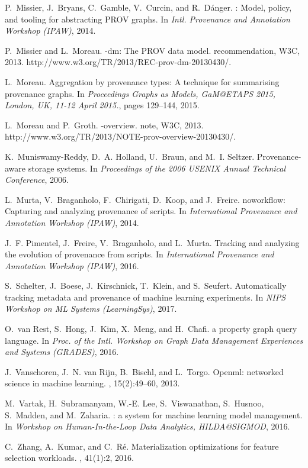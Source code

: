 \documentclass[11pt]{article}
\begin{document}
\begin{thebibliography}{10}
P.~Missier, J.~Bryans, C.~Gamble, V.~Curcin, and R.~D{\'{a}}nger.
: Model, policy, and tooling for abstracting {PROV} graphs.
\newblock In {\em Intl. Provenance and Annotation Workshop (IPAW)}, 2014.

P.~Missier and L.~Moreau.
-dm: The {PROV} data model.
 recommendation, W3C, 2013.
\newblock http://www.w3.org/TR/2013/REC-prov-dm-20130430/.

L.~Moreau.
\newblock Aggregation by provenance types: {A} technique for summarising
  provenance graphs.
\newblock In {\em Proceedings Graphs as Models, GaM@ETAPS 2015, London, UK,
  11-12 April 2015.}, pages 129--144, 2015.

L.~Moreau and P.~Groth.
-overview.
 note, W3C, 2013.
\newblock http://www.w3.org/TR/2013/NOTE-prov-overview-20130430/.

K.~Muniswamy{-}Reddy, D.~A. Holland, U.~Braun, and M.~I. Seltzer.
\newblock Provenance-aware storage systems.
\newblock In {\em Proceedings of the 2006 {USENIX} Annual Technical Conference}, 2006.

L.~Murta, V.~Braganholo, F.~Chirigati, D.~Koop, and J.~Freire.
\newblock noworkflow: Capturing and analyzing provenance of scripts.
\newblock In {\em  International Provenance and Annotation Workshop (IPAW)}, 2014.

J.~F. Pimentel, J.~Freire, V.~Braganholo, and L.~Murta.
\newblock Tracking and analyzing the evolution of provenance from scripts.
\newblock In {\em  International Provenance and Annotation Workshop (IPAW)}, 2016.

S.~Schelter, J.~Boese, J.~Kirschnick, T.~Klein, and S.~Seufert.
\newblock Automatically tracking metadata and provenance of machine learning
  experiments.
\newblock In {\em NIPS Workshop on ML Systems (LearningSys)}, 2017.

O.~van Rest, S.~Hong, J.~Kim, X.~Meng, and H.~Chafi.
 a property graph query language.
\newblock In {\em Proc. of the Intl. Workshop on Graph
  Data Management Experiences and Systems (GRADES)}, 2016.

J.~Vanschoren, J.~N. van Rijn, B.~Bischl, and L.~Torgo.
\newblock Openml: networked science in machine learning.
, 15(2):49--60, 2013.

M.~Vartak, H.~Subramanyam, W.-E. Lee, S.~Viswanathan, S.~Husnoo, S.~Madden, and
  M.~Zaharia.
: a system for machine learning model management.
\newblock In {\em Workshop on Human-In-the-Loop Data Analytics,
  HILDA@SIGMOD}, 2016.

C.~Zhang, A.~Kumar, and C.~R{\'e}.
\newblock Materialization optimizations for feature selection workloads.
, 41(1):2, 2016.

\end{thebibliography}
\end{document}
